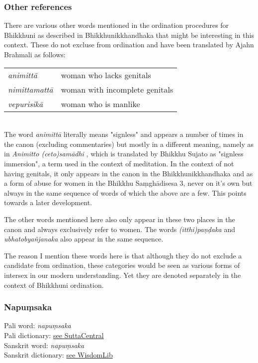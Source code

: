 \subsubsection{Other references}
There are various other words mentioned in the ordination procedures for Bhikkhuni as described in Bhikkhunikkhandhaka that might be interesting in this context. These do not excluse from ordination and have been translated by Ajahn Brahmali as follows: \\

\begin{tabular}{ l l }
 {\em animittā } & woman who lacks genitals \\
 {\em nimittamattā } & woman with incomplete genitals \\ 
 {\em vepurisikā } & woman who is manlike \\
\end{tabular} \\

The word {\em animittā } literally means "signless" and appears a number of times in the canon (excluding commentaries) but mostly in a different meaning, namely as in {\em Animitto (ceto)samādhi }, which is translated by Bhikkhu Sujato as "signless immersion", a term used in the context of meditation. In the context of not having genitals, it only appears in the canon in the Bhikkhunikkhandhaka and as a form of abuse for women in the Bhikkhu Saṃ­ghā­di­sesa­ 3, never on it's own but always in the same sequence of words of which the above are a few. This points towards a later development.

The other words mentioned here also only appear in these two places in the canon and always exclusively refer to women. The words {\em (itthi)paṇḍaka } and {\em ubhatob­yañ­janaka } also appear in the same sequence.

The reason I mention these words here is that although they do not exclude a candidate from ordination, these categories would be seen as various forms of intersex in our modern understanding. Yet they are denoted separately in the context of Bhikkhuni ordination. 


\subsubsection{Napuṃsaka}

Pali word: {\em napuṃsaka} \\
Pali dictionary: \href{https://suttacentral.net/define/napu%E1%B9%83saka}{see SuttaCentral} \\
Sanskrit word: {\em napuṃsaka} \\
Sanskrit dictionary: \href{https://www.wisdomlib.org/definition/napumsaka}{see WisdomLib} \\

